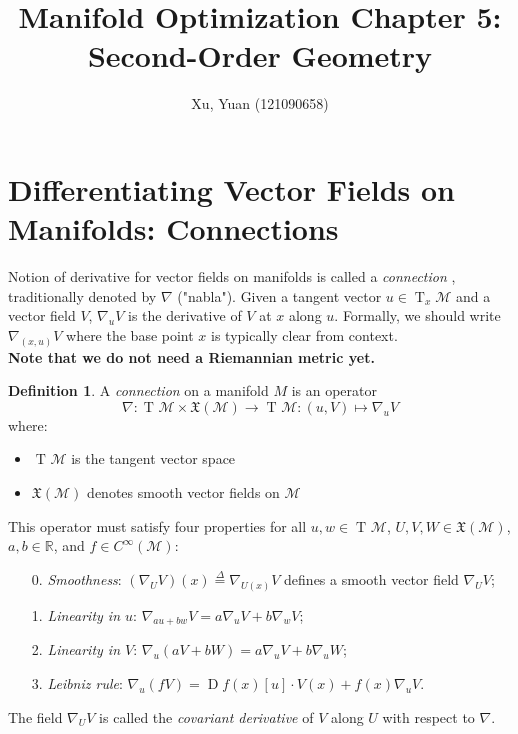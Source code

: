 \documentclass{article}
\title{Manifold Optimization Chapter 5: Second-Order Geometry}
\author{Xu, Yuan (121090658)}
\theoremstyle{plain}
\theoremstyle{definition}
\newtheorem{definition}[theorem]{Definition}
\newcommand{\Tang}[2]{\operatorname{T}_{#1}{\mathcal{#2}}}
\newcommand{\VecF}[1]{\mathfrak{X}(\mathcal{#1})}
\newcommand{\Conn}[3]{#1\nabla_{#2}{#3}}
\newcommand{\DirDeri}[3]{\operatorname{D}{#1}(#2)[#3]}
\def\calM{\mathcal{M}}
\def\Def{\stackrel{\Delta}{=}}
\begin{document}
\maketitle

\section{Differentiating Vector Fields on Manifolds: Connections}

Notion of derivative for vector fields on manifolds is called a \textit{connection}%
, traditionally denoted by $\nabla$ ("nabla"). Given a tangent vector $u \in \Tang{x}{M}$ and a vector field $V$, $\nabla_uV$ is the derivative of $V$ at $x$ along $u$. Formally, we should write $\nabla_{(x,u)} V$ where the base point $x$ is typically clear from context. \\
\textbf{Note that we do not need a Riemannian metric yet. }
\begin{definition}
A \textit{connection} on a manifold $M$ is an operator
$$
\nabla \colon \Tang{}{M} \times \VecF{M} \to \Tang{}{M}: (u, V) \mapsto \nabla_u V
$$
where:
\begin{itemize}
    \item $\Tang{}{M}$ is the tangent vector space
    \item $\VecF{M}$ denotes smooth vector fields on $\calM$
\end{itemize}
This operator must satisfy four properties for all $u,w \in \Tang{}{M}$, $U,V,W \in \VecF{M}$, $a,b \in \mathbb{R}$, and $f \in C^\infty(\calM)$:
\begin{enumerate}
    \item[0.] \textit{Smoothness}: %
    $(\nabla_UV)(x) \Def \nabla_{U(x)}V$ defines a smooth vector field $\nabla_UV$;
    \item[1.] \textit{Linearity in $u$}: 
    $\nabla_{au + bw}V = a\nabla_uV + b\nabla_wV$;
    \item[2.] \textit{Linearity in $V$}: 
    $\nabla_u(aV + bW) = a\nabla_uV + b\nabla_uW$;
    \item[3.] \textit{Leibniz rule}: 
    $\nabla_u(fV) = \DirDeri{f}{x}{u}\cdot V(x) + f(x)\Conn{}{u}{V}$. %
\end{enumerate}
\end{definition}

The field $\nabla_U V$ is called the \textit{covariant derivative} of $V$ along $U$ with respect to $\nabla$.
\end{document}
